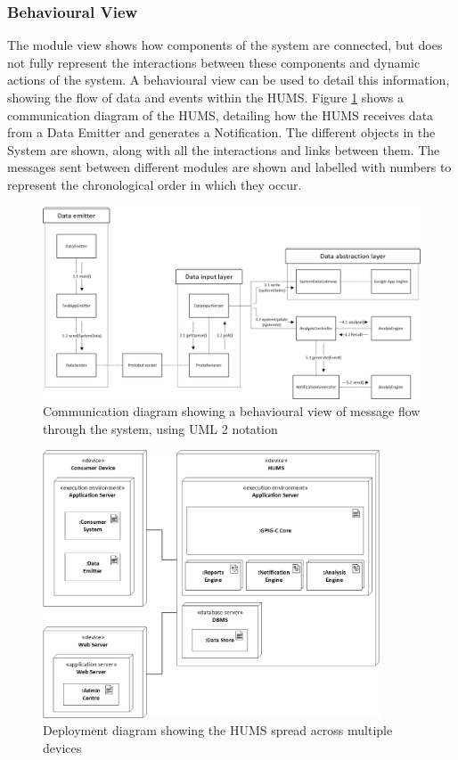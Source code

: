 \documentclass[10pt,a4paper]{article}
\begin{document}
\subsubsection{Behavioural View}

The module view shows how components of the system are connected, but does not fully represent the interactions between these components and dynamic actions of the system. A behavioural view can be used to detail this information, showing the flow of data and events within the HUMS. Figure \ref{fig:CommunicationDiagram} shows a communication diagram of the HUMS, detailing how the HUMS receives data from a Data Emitter and generates a Notification. The different objects in the System are shown, along with all the interactions and links between them. The messages sent between different modules are shown and labelled with numbers to represent the chronological order in which they occur.

\begin{figure}[!ht]
  \centering
  \includegraphics[width=14cm]{images/CommunicationDiagram.png}
  \caption{Communication diagram showing a behavioural view of message 
flow through the system, using UML 2 notation}
  \label{fig:CommunicationDiagram}
\end{figure}

\begin{figure}[!ht]
  \centering
  \includegraphics[width=10cm]{images/DeploymentDistributed.png}
  \caption{Deployment diagram showing the HUMS spread across multiple 
devices}
  \label{fig:DeploymentDistributed}
\end{figure}
\end{document}
